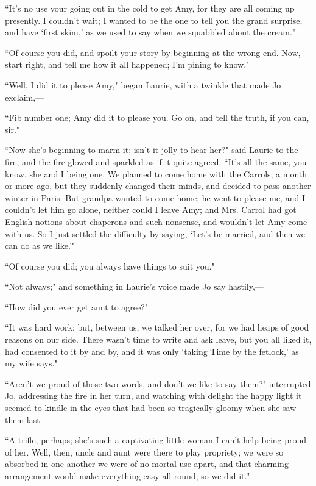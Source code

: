 ``It's no use your going out in the cold to get Amy, for
they are all coming up presently. I couldn't wait; I
wanted to be the one to tell you the grand surprise, and have
`first skim,' as we used to say when we
squabbled about the cream."

``Of course you did, and spoilt your story by beginning at the wrong end.
Now, start right, and tell me how it all happened; I'm
pining to know."

``Well, I did it to please Amy," began Laurie, with a twinkle that made
Jo exclaim,---

``Fib number one; Amy did it to please you. Go on, and tell the truth, if
you can, sir."

``Now she's beginning to marm it; isn't
it jolly to hear her?" said Laurie to the fire, and the fire glowed and
sparkled as if it quite agreed. ``It's all the same, you
know, she and I being one. We planned to come home with the Carrols, a
month or more ago, but they suddenly changed their minds, and decided to
pass another winter in Paris. But grandpa wanted to come home; he went
to please me, and I couldn't let him go alone, neither
could I leave Amy; and Mrs. Carrol had got English notions about
chaperons and such nonsense, and wouldn't let Amy come
with us. So I just settled the difficulty by saying,
`Let's be married, and then we can do as
we like.'"

``Of course you did; you always have things to suit you."

``Not always;" and something in Laurie's voice made Jo
say hastily,---

``How did you ever get aunt to agree?"

``It was hard work; but, between us, we talked her over, for we had heaps
of good reasons on our side. There wasn't time to write
and ask leave, but you all liked it, had consented to it by and by, and
it was only `taking Time by the
fetlock,' as my wife says."

``Aren't we proud of those two words, and
don't we like to say them?" interrupted Jo, addressing
the fire in her turn, and watching with delight the happy light it
seemed to kindle in the eyes that had been so tragically gloomy when she
saw them last.

``A trifle, perhaps; she's such a captivating little
woman I can't help being proud of her. Well, then, uncle
and aunt were there to play propriety; we were so absorbed in one
another we were of no mortal use apart, and that charming arrangement
would make everything easy all round; so we did it."

